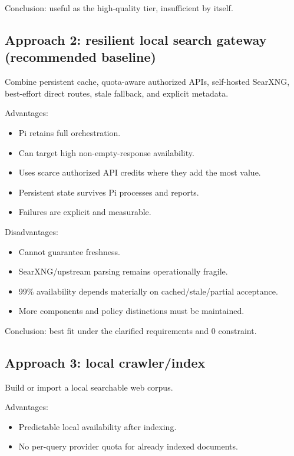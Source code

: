 \documentclass[11pt]{article}
\begin{document}
Conclusion: useful as the high-quality tier, insufficient by itself.
\subsection*{Approach 2: resilient local search gateway (recommended baseline)}
\label{sec:org661f093}

Combine persistent cache, quota-aware authorized APIs, self-hosted SearXNG,
best-effort direct routes, stale fallback, and explicit metadata.

Advantages:

\begin{itemize}
\item Pi retains full orchestration.
\item Can target high non-empty-response availability.
\item Uses scarce authorized API credits where they add the most value.
\item Persistent state survives Pi processes and reports.
\item Failures are explicit and measurable.
\end{itemize}

Disadvantages:

\begin{itemize}
\item Cannot guarantee freshness.
\item SearXNG/upstream parsing remains operationally fragile.
\item 99\% availability depends materially on cached/stale/partial acceptance.
\item More components and policy distinctions must be maintained.
\end{itemize}

Conclusion: best fit under the clarified requirements and 0 constraint.
\subsection*{Approach 3: local crawler/index}
\label{sec:orga792812}

Build or import a local searchable web corpus.

Advantages:

\begin{itemize}
\item Predictable local availability after indexing.
\item No per-query provider quota for already indexed documents.
\end{itemize}
\end{document}
